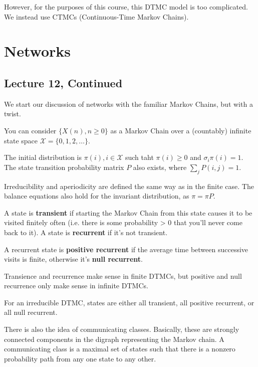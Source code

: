 However, for the purposes of this course, this DTMC model is too complicated. We instead use CTMCs (Continuous-Time
Markov Chains).

\section{Networks}

\subsection{Lecture 12, Continued}

We start our discussion of networks with the familiar Markov Chains, but with a twist.

\begin{definition}
    You can consider $\{X(n), n \geq 0\}$ as a Markov Chain over a (countably) infinite state space $\mathcal{X} = \{0, 1, 2, \dots\}$.
    
    The initial distribution is $\pi(i), i \in \mathcal{X}$ such taht $\pi(i) \geq 0$ and $\sigma_i \pi(i) = 1$.
    The state transition probability matrix $P$ also exists, where $\sum_j P(i, j) = 1$.
\end{definition}

Irreducibility and aperiodicity are defined the same way as in the finite case. The balance equations also hold for
the invariant distribution, as $\pi = \pi P$.

\begin{definition}
    A state is \textbf{transient} if starting the Markov Chain from this state causes it to be visited finitely often (i.e. there
    is some probability > 0 that you'll never come back to it). A state is 
    \textbf{recurrent} if it's not transient.

    A recurrent state is \textbf{positive recurrent} if the average time between successive visits is finite, otherwise
    it's \textbf{null recurrent}.
\end{definition}

Transience and recurrence make sense in finite DTMCs, but positive and null recurrence only make sense in infinite DTMCs.

\begin{theorem}
    For an irreducible DTMC, states are either all transient, all positive recurrent, or all null recurrent.
\end{theorem}

There is also the idea of communicating classes. Basically, these are
strongly connected components in the digraph representing the Markov chain. A communicating class is a maximal set of
states such that there is a nonzero probability path from any one state to any other.

